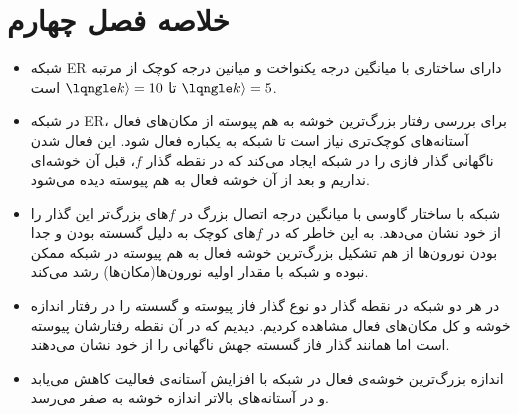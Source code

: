  \section{خلاصه فصل چهارم}
 \begin{itemize}
 \item شبکه ER دارای ساختاری با میانگین درجه یکنواخت و میانین درجه کوچک از مرتبه $\lqngle k \rangle = 5$ تا $\lqngle k \rangle = 10 $ است. 
 \item در شبکه ER، برای بررسی رفتار بزرگ‌ترین خوشه به هم پیوسته از مکان‌های فعال آستانه‌های کوچک‌تری نیاز است تا شبکه به یکباره فعال شود. این فعال شدن ناگهانی گذار فازی را در شبکه ایجاد می‌کند که در نقطه گذار  $f$، قبل آن خوشه‌ای نداریم و بعد از آن خوشه فعال به هم پیوسته دیده می‌شود.
 \item شبکه با ساختار گاوسی با میانگین درجه اتصال  بزرگ در $f$های بزرگ‌تر این گذار را از خود نشان می‌دهد. به این خاطر که در 
 $f$های کوچک به دلیل  گسسته بودن و جدا بودن نورون‌ها از هم تشکیل بزرگ‌ترین خوشه  فعال به هم پیوسته در شبکه ممکن نبوده و شبکه با مقدار اولیه نورون‌ها(مکان‌ها) رشد می‌کند.
 \item در هر دو شبکه در نقطه گذار دو نوع گذار فاز پیوسته و گسسته را در رفتار اندازه خوشه و کل مکان‌های فعال  مشاهده کردیم. دیدیم که در آن نقطه رفتارشان پیوسته  است اما همانند گذار فاز گسسته جهش ناگهانی را از خود نشان می‌دهند.
 \item اندازه بزرگ‌ترین خوشه‌ی فعال در شبکه با افزایش آستانه‌ی فعالیت کاهش می‌یابد و در آستانه‌های بالاتر اندازه خوشه به صفر می‌رسد.

 \end{itemize} 






